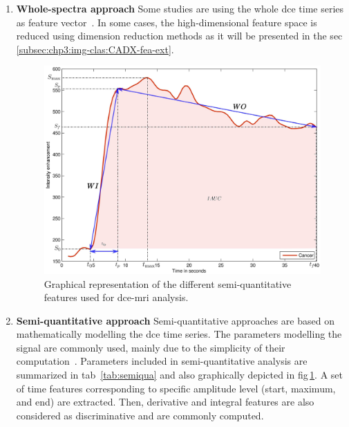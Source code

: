 \begin{enumerate}[leftmargin=*]

\item[] \textbf{Whole-spectra approach}
Some studies are using the whole \ac{dce} time series as feature
vector~\cite{Ampeliotis2007,Ampeliotis2008,Tiwari2012,Viswanath2008a,Viswanath2008,Lemaitre2016thesis}.
In some cases, the high-dimensional feature space is reduced using dimension
reduction methods as it will be presented in the
\acs{sec}\,\ref{subsec:chp3:img-clas:CADX-fea-ext}.

\begin{figure}
  \centering
  \includegraphics[width=.8\linewidth]{3_review/figures/feature-detection/dce/dce_cancer_parameters.eps}
  \caption[Semi-quantitative features used for
  \acs*{dce}-\acs*{mri}.]{Graphical representation of the different
    semi-quantitative features used for \acs*{dce}-\acs*{mri} analysis.}
  \label{fig:dceparam}
\end{figure}

\item[] \textbf{Semi-quantitative approach}
Semi-quantitative approaches are based on mathematically modelling the \ac{dce}
time series.
The parameters modelling the signal are commonly used, mainly due to the
simplicity of their
computation~\cite{Puech2009,Mazzetti2011,Niaf2011,Niaf2012,Sung2011,trigui2016classification,trigui2017automatic,lehaire2014computer,samarasinghe2016semi,giannini2015fully,Lemaitre2016thesis}.
Parameters included in semi-quantitative analysis are summarized in
\acs{tab}~\ref{tab:semiqua} and also graphically depicted in
\acs{fig}\,\ref{fig:dceparam}.
A set of time features corresponding to specific amplitude level (start,
maximum, and end) are extracted.
Then, derivative and integral features are also considered as discriminative
and are commonly computed.


\end{enumerate}
